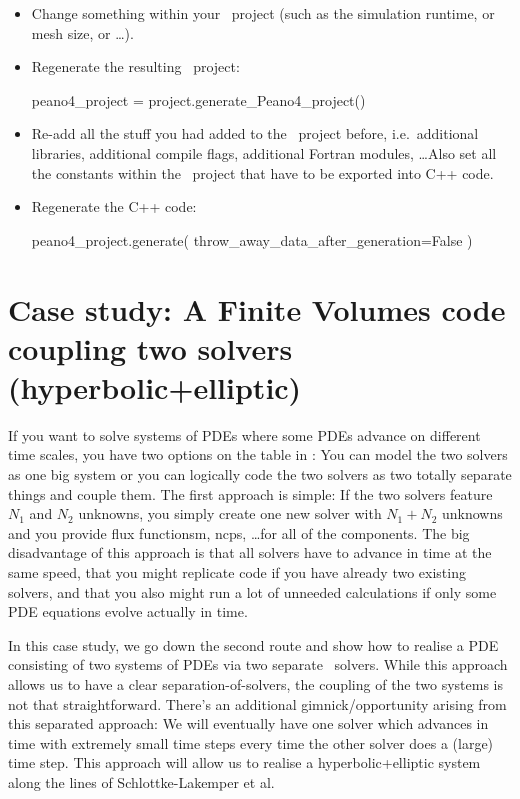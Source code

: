 \begin{itemize}
  \item Change something within your \ExaHyPE\ project (such as the simulation
  runtime, or mesh size, or \ldots).
  \item Regenerate the resulting \Peano\ project: 
  \begin{code}
peano4_project = project.generate_Peano4_project()
  \end{code}
  \item Re-add all the stuff you had added to the \Peano\ project before,
  i.e.~additional libraries, additional compile flags, additional
  Fortran modules, \ldots Also set all the constants within the \Peano\ project
  that have to be exported into C++ code.
  \item Regenerate the C++ code:
  \begin{code}
peano4_project.generate( throw_away_data_after_generation=False )  
  \end{code}
\end{itemize}


\section{Case study: A Finite Volumes code coupling two solvers  (hyperbolic+elliptic)}
\label{section:exahype:fv:coupling}

If you want to solve systems of PDEs where some PDEs advance on different time
scales, you have two options on the table in \ExaHyPE: 
You can model the two solvers as one big system or you can logically code the
two solvers as two totally separate things and couple them.
The first approach is simple: If the two solvers feature $N_1$ and $N_2$ unknowns,
you simply create one new solver with $N_1+N_2$ unknowns and you provide flux 
functionsm, ncps, \ldots for all of the components.
The big disadvantage of this approach is that all solvers have to advance in time
at the same speed, that you might replicate code if you have already two existing
solvers, and that you also might run a lot of unneeded calculations if only some
PDE equations evolve actually in time.


In this case study, we go down the second route and show how to realise a PDE 
consisting of two systems of PDEs via two separate \ExaHyPE\ solvers.
While this approach allows us to have a clear separation-of-solvers, the coupling
of the two systems is not that straightforward.
There's an additional gimnick/opportunity arising from this separated approach:
We will eventually have one solver which advances in time with extremely small time
steps every time the other solver does a (large) time step.
This approach will allow us to realise a hyperbolic+elliptic system along the lines
of Schlottke-Lakemper et al. 

